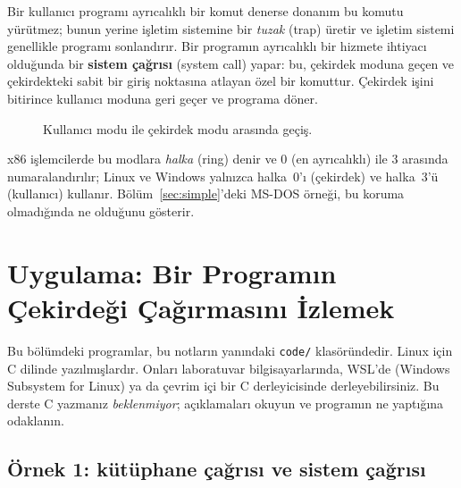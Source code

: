 \documentclass[11pt,a4paper]{article}
\newcommand{\term}[1]{\textbf{\color{mintdeep}#1}}
\begin{document}
Bir kullanıcı programı ayrıcalıklı bir komut denerse donanım bu komutu yürütmez; bunun yerine işletim sistemine bir \emph{tuzak} (trap) üretir ve işletim sistemi genellikle programı sonlandırır. Bir programın ayrıcalıklı bir hizmete ihtiyacı olduğunda bir \term{sistem çağrısı} (system call) yapar: bu, çekirdek moduna geçen ve çekirdekteki sabit bir giriş noktasına atlayan özel bir komuttur. Çekirdek işini bitirince kullanıcı moduna geri geçer ve programa döner.

\begin{figure}[H]
\centering
{}
\caption{Kullanıcı modu ile çekirdek modu arasında geçiş.}
\end{figure}

x86 işlemcilerde bu modlara \emph{halka} (ring) denir ve $0$ (en ayrıcalıklı) ile $3$ arasında numaralandırılır; Linux ve Windows yalnızca halka~0'ı (çekirdek) ve halka~3'ü (kullanıcı) kullanır. Bölüm~\ref{sec:simple}'deki MS-DOS örneği, bu koruma olmadığında ne olduğunu gösterir.

\section{Uygulama: Bir Programın Çekirdeği Çağırmasını İzlemek}
\label{sec:syscall}

Bu bölümdeki programlar, bu notların yanındaki \texttt{code/} klasöründedir. Linux için C dilinde yazılmışlardır. Onları laboratuvar bilgisayarlarında, WSL'de (Windows Subsystem for Linux) ya da çevrim içi bir C derleyicisinde derleyebilirsiniz. Bu derste C yazmanız \emph{beklenmiyor}; açıklamaları okuyun ve programın ne yaptığına odaklanın.

\subsection{Örnek 1: kütüphane çağrısı ve sistem çağrısı}
\end{document}
